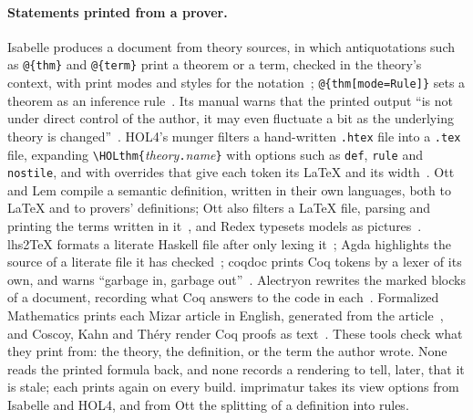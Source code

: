 \documentclass[acmsmall,screen,review,anonymous,nonacm]{acmart}
\begin{document}
\paragraph{Statements printed from a prover.} Isabelle produces a document
from theory sources, in which antiquotations such as \verb|@{thm}| and
\verb|@{term}| print a theorem or a term, checked in the theory's context,
with print modes and styles for the notation~\cite{Wenzel26,Wenzel18};
\verb|@{thm[mode=Rule]}| sets a theorem as an inference
rule~\cite{Haftmann26}. Its manual warns that the printed output ``is not
under direct control of the author, it may even fluctuate a bit as the
underlying theory is changed''~\cite[\S4.2]{Wenzel26}. HOL4's munger
filters a hand-written \verb|.htex| file into a \verb|.tex| file, expanding
\verb|\HOLthm{|\emph{theory}\verb|.|\emph{name}\verb|}| with options such as
\verb|def|, \verb|rule| and \verb|nostile|, and with overrides that give
each token its \LaTeX{} and its width~\cite{HOL25}. Ott and Lem compile a
semantic definition, written in their own languages, both to \LaTeX{} and to
provers' definitions; Ott also filters a \LaTeX{} file, parsing and
printing the terms written in it~\cite{Sewell10,Mulligan14}, and Redex
typesets models as pictures~\cite{Klein12}. lhs2TeX formats a literate
Haskell file after only lexing it~\cite{Hinze25}; Agda highlights the source
of a literate file it has checked~\cite{Agda26}; coqdoc prints Coq tokens
by a lexer of its own, and warns ``garbage in, garbage
out''~\cite{CoqDoc20}. Alectryon rewrites the marked blocks of a document,
recording what Coq answers to the code in each~\cite{PitClaudel20}.
Formalized Mathematics prints each Mizar article in English, generated
from the article~\cite{Bancerek18}, and Coscoy, Kahn and Théry render Coq
proofs as text~\cite{Coscoy95}. These tools check what they print from:
the theory, the definition, or the term the author wrote. None reads the
printed formula back, and none records a rendering to tell, later, that it
is stale; each prints again on every build. imprimatur takes its view
options from Isabelle and HOL4, and from Ott the splitting of a definition
into rules.
\end{document}
